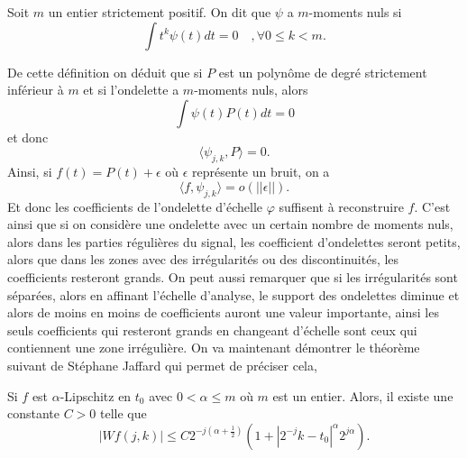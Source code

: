 \begin{definition}
	Soit $m$ un entier strictement positif.
	On dit que $\psi$ a $m$-moments nuls si
	\begin{equation*}
		\int t^k \psi(t)dt = 0 \quad, \forall 0\leq k < m.
	\end{equation*}
\end{definition}
De cette définition on déduit que si $P$ est un polynôme de degré strictement inférieur à $m$ et si l'ondelette a $m$-moments nuls, alors
\begin{equation}\label{eq:momPol}
	\int \psi(t) P(t) dt = 0
\end{equation}
et donc 
\begin{equation}
	\langle \psi_{j,k}, P \rangle = 0.
\end{equation}
Ainsi, si $f(t) = P(t) +\epsilon$ où $\epsilon$ représente un bruit, on a 
\begin{equation*}
	\langle f, \psi_{j,k} \rangle = o(||\epsilon||).
\end{equation*}
Et donc les coefficients de l'ondelette d'échelle $\varphi$ suffisent à reconstruire $f$.
C'est ainsi que si on considère une ondelette avec un certain nombre de moments nuls, alors dans les parties régulières du signal, les coefficient d'ondelettes seront petits, alors que dans les zones avec des irrégularités ou des discontinuités, les coefficients resteront grands.
On peut aussi remarquer que si les irrégularités sont séparées, alors en affinant l'échelle d'analyse, le support des ondelettes diminue et alors de moins en moins de coefficients auront une valeur importante, ainsi les seuls coefficients qui resteront grands en changeant d'échelle sont ceux qui contiennent une zone irrégulière. 
\newline
On va maintenant démontrer le théorème suivant de Stéphane Jaffard qui permet de préciser cela,
\begin{theoreme}[Jaffard]\label{th:Jaffard}
	Si $f$ est $\alpha$-Lipschitz en $t_0$ avec $0 < \alpha \leq m$ où $m$ est un entier.
	Alors, il existe une constante $C >0$ telle que 
	\begin{equation*}
		|Wf(j, k)| \leq C2^{-j(\alpha + \frac{1}{2})}(1 + |2^{-j}k - t_0|^\alpha2^{j\alpha}).
	\end{equation*}
\end{theoreme}
